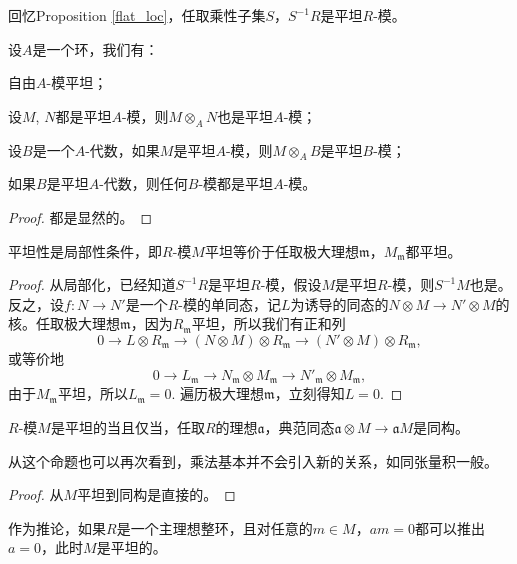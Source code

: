 回忆Proposition \ref{flat_loc}，任取乘性子集$S$，$S^{-1}R$是平坦$R$-模。

\begin{pro}
	设$A$是一个环，我们有：
	\begin{compactenum}
		\item 自由$A$-模平坦；
		\item 设$M$, $N$都是平坦$A$-模，则$M\otimes_A N$也是平坦$A$-模；
		\item 设$B$是一个$A$-代数，如果$M$是平坦$A$-模，则$M\otimes_A B$是平坦$B$-模； 
		\item 如果$B$是平坦$A$-代数，则任何$B$-模都是平坦$A$-模。
	\end{compactenum}
\end{pro}

\begin{proof}
	都是显然的。
\end{proof}

\begin{pro}
	平坦性是局部性条件，即$R$-模$M$平坦等价于任取极大理想$\mathfrak m$，$M_{\mathfrak m}$都平坦。
\end{pro}

\begin{proof}
	从局部化，已经知道$S^{-1}R$是平坦$R$-模，假设$M$是平坦$R$-模，则$S^{-1}M$也是。反之，设$f:N\to N'$是一个$R$-模的单同态，记$L$为诱导的同态的$N\otimes M\to N'\otimes M$的核。任取极大理想$\mathfrak m$，因为$R_{\mathfrak m}$平坦，所以我们有正和列
	\[
		0\to L\otimes R_{\mathfrak m}\to (N\otimes M)\otimes R_{\mathfrak m}\to (N'\otimes M)\otimes R_{\mathfrak m},
	\]
	或等价地
	\[
		0\to L_{\mathfrak m}\to N_{\mathfrak m}\otimes M_{\mathfrak m}\to N'_{\mathfrak m}\otimes M_{\mathfrak m},
	\]
	由于$M_{\mathfrak m}$平坦，所以$L_{\mathfrak m}=0$. 遍历极大理想$\mathfrak m$，立刻得知$L=0$.
\end{proof}

\begin{pro}
	$R$-模$M$是平坦的当且仅当，任取$R$的理想$\mathfrak a$，典范同态$\mathfrak a\otimes M\to \mathfrak aM$是同构。
\end{pro}

从这个命题也可以再次看到，乘法基本并不会引入新的关系，如同张量积一般。

\begin{proof}
	从$M$平坦到同构是直接的。\notprove
\end{proof}

作为推论，如果$R$是一个主理想整环，且对任意的$m\in M$，$am=0$都可以推出$a=0$，此时$M$是平坦的。

